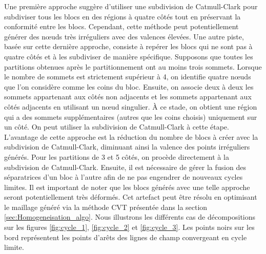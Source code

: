 Une première approche suggère d'utiliser une subdivision de Catmull-Clark pour subdiviser tous les blocs en des régions à quatre côtés tout en préservant la conformité entre les blocs. Cependant, cette méthode peut potentiellement générer des nœuds très irréguliers avec des valences élevées. Une autre piste, basée sur cette dernière approche, consiste à repérer les blocs qui ne sont pas à quatre côtés et à les subdiviser de manière spécifique. Supposons que toutes les partitions obtenues après le partitionnement ont au moins trois sommets. Lorsque le nombre de sommets est strictement supérieur à 4, on identifie quatre nœuds que l'on considère comme les coins du bloc. Ensuite, on associe deux à deux les sommets appartenant aux côtés non adjacents et les sommets appartenant aux côtés adjacents en utilisant un nœud singulier. À ce stade, on obtient une région qui a des sommets supplémentaires (autres que les coins choisis) uniquement sur un côté. On peut utiliser la subdivision de Catmull-Clark à cette étape. L'avantage de cette approche est la réduction du nombre de blocs à créer avec la subdivision de Catmull-Clark, diminuant ainsi la valence des points irréguliers générés. Pour les partitions de 3 et 5 côtés, on procède directement à la subdivision de Catmull-Clark. Ensuite, il est nécessaire de gérer la fusion des séparatrices d'un bloc à l'autre afin de ne pas engendrer de nouveaux cycles limites. Il est important de noter que les blocs générés avec une telle approche seront potentiellement très déformés. Cet artefact peut être résolu en optimisant le maillage généré via la méthode CVT présentée dans la section \ref{sec:Homogeneisation_algo}. Nous illustrons les différents cas de décompositions sur les figures \ref{fig:cycle_1}, \ref{fig:cycle_2} et \ref{fig:cycle_3}. Les points noirs sur les bord représentent les points d'arêts des lignes de champ convergeant en cycle limite.


